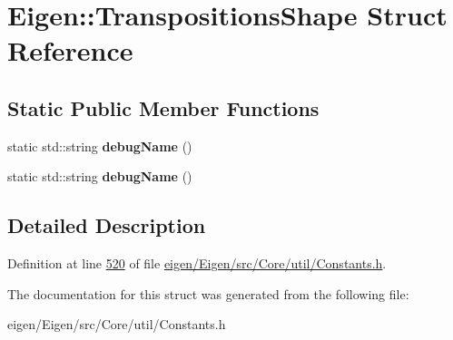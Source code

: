 \hypertarget{struct_eigen_1_1_transpositions_shape}{}\section{Eigen\+:\+:Transpositions\+Shape Struct Reference}
\label{struct_eigen_1_1_transpositions_shape}
\subsection*{Static Public Member Functions}
\begin{DoxyCompactItemize}
\item 
\mbox{\label{struct_eigen_1_1_transpositions_shape_afad8fac6c0338e163cca86f04fe12cdb}} 
static std\+::string {\bfseries debug\+Name} ()
\item 
\mbox{\label{struct_eigen_1_1_transpositions_shape_afad8fac6c0338e163cca86f04fe12cdb}} 
static std\+::string {\bfseries debug\+Name} ()
\end{DoxyCompactItemize}


\subsection{Detailed Description}


Definition at line \hyperlink{eigen_2_eigen_2src_2_core_2util_2_constants_8h_source_l00520}{520} of file \hyperlink{eigen_2_eigen_2src_2_core_2util_2_constants_8h_source}{eigen/\+Eigen/src/\+Core/util/\+Constants.\+h}.



The documentation for this struct was generated from the following file\+:\begin{DoxyCompactItemize}
\item 
eigen/\+Eigen/src/\+Core/util/\+Constants.\+h\end{DoxyCompactItemize}

